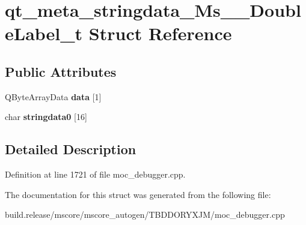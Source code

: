 \hypertarget{structqt__meta__stringdata___ms_____double_label__t}{}\section{qt\+\_\+meta\+\_\+stringdata\+\_\+\+Ms\+\_\+\+\_\+\+Double\+Label\+\_\+t Struct Reference}
\label{structqt__meta__stringdata___ms_____double_label__t}
\subsection*{Public Attributes}
\begin{DoxyCompactItemize}
\item 
\mbox{\label{structqt__meta__stringdata___ms_____double_label__t_a9047f07b066f8766206515c3755dd0c5}} 
Q\+Byte\+Array\+Data {\bfseries data} \mbox{[}1\mbox{]}
\item 
\mbox{\label{structqt__meta__stringdata___ms_____double_label__t_a6409dbfaa217d0cd0d04a71ea0681be9}} 
char {\bfseries stringdata0} \mbox{[}16\mbox{]}
\end{DoxyCompactItemize}


\subsection{Detailed Description}


Definition at line 1721 of file moc\+\_\+debugger.\+cpp.



The documentation for this struct was generated from the following file\+:\begin{DoxyCompactItemize}
\item 
build.\+release/mscore/mscore\+\_\+autogen/\+T\+B\+D\+D\+O\+R\+Y\+X\+J\+M/moc\+\_\+debugger.\+cpp\end{DoxyCompactItemize}
